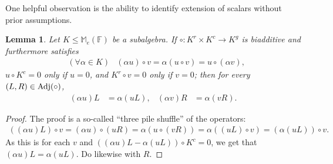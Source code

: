\documentclass{toc}
\numberwithin{equation}{section}
\theoremstyle{plain}       %
\newtheorem{lem}[equation]{Lemma}
\theoremstyle{remark}
\theoremstyle{definition}
\numberwithin{figure}{section}
\numberwithin{table}{section}
\newcommand{\bbF}{\mathbb{F}}  %
\begin{document}
One helpful observation is the ability to identify extension of scalars without
prior assumptions.

\begin{lem}\label{lem:centroid}
	Let $K\leq \mathbb{M}_e(\bbF)$ be a subalgebra.
	If $\circ:K^r\times K^c \to K^g$ is biadditive and furthermore satisfies
	\begin{align*}
		&(\forall \alpha\in K) & (\alpha u)\circ v = \alpha(u\circ v) 
			= u\circ(\alpha v),
	\end{align*}
	$u\circ K^c=0$ only if $u=0$, and $K^r\circ v=0$ only if $v=0$;
	then for every $(L,R)\in {\rm Adj}(\circ)$,
	\begin{align*}
		(\alpha u)L& =\alpha(uL), & (\alpha v)R &= \alpha(vR).
	\end{align*}
\end{lem}
\begin{proof} The proof is a so-called ``three pile shuffle'' of the operators:
	\begin{align*}
		((\alpha u)L)\circ v = (\alpha u)\circ (uR)
		=\alpha (u\circ (vR)) 
		= \alpha( (uL)\circ v)
		= (\alpha (uL))\circ v.
	\end{align*}
	As this is for each $v$ and $((\alpha u)L-\alpha (uL))\circ K^c=0$, we get
	that $(\alpha u)L=\alpha (uL)$.  Do likewise with $R$.
\end{proof}
\end{document}
